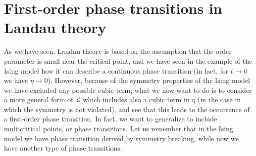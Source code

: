\documentclass[../main/main.tex]{subfiles}
\begin{document}
\section{First-order phase transitions in Landau theory}

As we have seen, Landau theory is based on the assumption that the order parameter is small near the critical point, and we have seen in the example of the Ising model how it can describe a continuous phase transition (in fact, for \( t \rightarrow 0 \) we have \( \eta \rightarrow 0 \)).
However, because of the symmetry properties of the Ising model we have excluded any possible cubic term; what we now want to do is to consider a more general form of
\( \mathcal{L} \) which includes also a cubic term in \( \eta  \) (in the case in which the symmetry is not violated), and see that this leads to the occurrence of a first-order phase transition.
In fact, we want to generalize to include multicritical points, or phase transitions. Let us remember that in the Ising model we have phase transition derived by symmetry breaking, while now we have another type of phase transitions.
\end{document}
